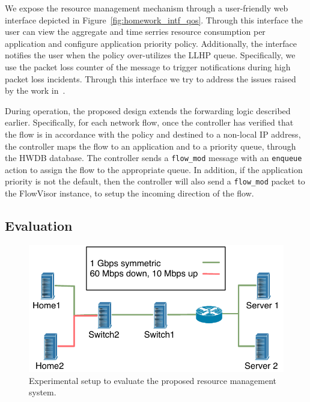 We expose the resource management mechanism through a user-friendly web
interface depicted in Figure~\ref{fig:homework_intf_qos}.  Through this
interface the user can view the aggregate and time serries resource consumption
per application and configure application priority policy. Additionally, the
interface notifies the user when the policy over-utilizes the LLHP queue.
Specifically, we use the packet loss counter of the 
message to trigger notifications during high packet loss incidents.  Through
this interface we try to address the issues raised by the work
in~\cite{Chetty10}. 

During operation, the proposed design extends the forwarding logic described
earlier. Specifically, for each network flow, once the controller has verified
that the flow is in accordance with the policy and destined to a non-local IP
address, the controller maps the flow to an application and to a priority queue,
through the HWDB database. The controller sends a {\tt flow\_mod} message with an
{\tt enqueue} action to assign the flow to the appropriate queue. In addition,
if the application priority is not the default, then the controller will also
send a {\tt flow\_mod} packet to the FlowVisor instance, to setup the incoming
direction of the flow. 

\subsection{Evaluation} \label{s:qos:eval}

\begin{figure}
  \centering
  \includegraphics[width=0.8\columnwidth]{queue_eval_setup}
  \caption{\label{fig:queue_eval_setup} Experimental setup to evaluate the
    proposed resource management system.}
\end{figure}

